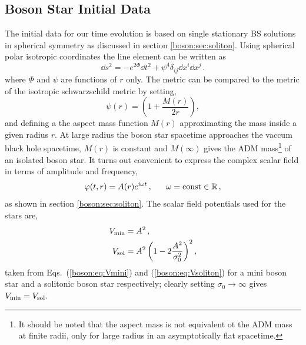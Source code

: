 \subsection{Boson Star Initial Data}
%
The initial data for our time evolution is based on single stationary
BS solutions in spherical symmetry as discussed in section \ref{boson:sec:soliton}.
Using spherical polar isotropic coordinates the
line element can be written as
%
\begin{equation}
  \dd s^2 =
  -e^{2\Phi} \dd t^2
  + \psi^4 \delta_{ij} \dd x^i \dd x^j\,.
  \label{mal:eq:ds2sym}
\end{equation}
%
where $\Phi$ and $\psi$ are functions of $r$ only. The metric can be compared to the metric of the isotropic schwarzschild metric by setting,
\begin{equation}
\psi(r) = \left(1+\frac{M(r)}{2 r} \right),
\end{equation} 
and defining a the aspect mass function $M(r)$ approximating the mass inside a given radius $r$. At large radius the boson star spacetime approaches the vaccum black hole spacetime, $M(r)$ is constant and $M(\infty)$ gives the ADM mass\footnote{It should be noted that the aspect mass is not equivalent ot the ADM mass at finite radii, only for large radius in an asymptotically flat spacetime.} of an isolated boson star.
It turns out convenient to express the complex
scalar field in terms of amplitude and frequency,
%
\begin{equation}
  \varphi(t,r) =
  A(r)
  e^{{\rm i} \omega t}\,,~~~~~\omega = \mathrm{const}\in \mathbb{R}\,,
\end{equation}
as shown in section \ref{boson:sec:soliton}. The scalar field potentials used for the stars are,
\begin{align}
  {V}_{\rm min} &= {A}^2\,,~~~~~~~~~~ \label{mal:eq:Vmini} \\
  {V}_{\rm sol} &= {A}^2 \left( 1-2\frac{{A}^2}{{\sigma}_0^2} \right)^2, \label{mal:eq:Vsoliton} 
\end{align}
taken from Eqs.~(\ref{boson:eq:Vmini}) and (\ref{boson:eq:Vsoliton}) for a mini boson star and a solitonic boson star respectively; clearly setting $\sigma_0 \rightarrow \infty$ gives $V_{\rm min} = V_{\rm sol}$.



